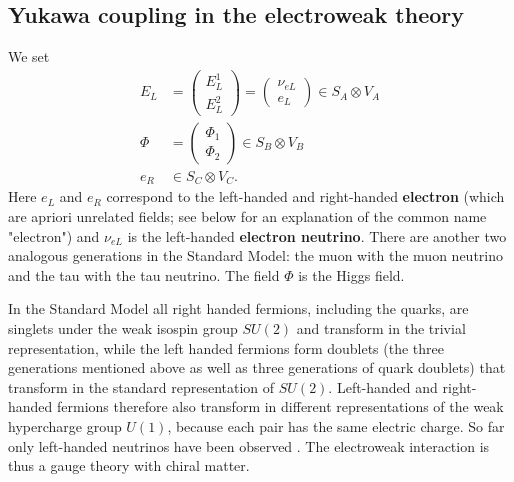 \documentclass[12pt]{amsart}
\theoremstyle{definition}
\theoremstyle{remark}
\numberwithin{equation}{section}
\begin{document}
\subsection{Yukawa coupling in the electroweak theory}
We set
\begin{align*}
E_L&=\left(\begin{array}{c}E^1_L\\ E^2_L\end{array}\right)=\left(\begin{array}{c}\nu_{eL}\\ e_L\end{array}\right)\in S_A\otimes V_A\\
\Phi&=\left(\begin{array}{c}\Phi_1\\\Phi_2\end{array}\right)\in S_B\otimes V_B\\
e_R&\in S_C\otimes V_C.
\end{align*}
Here $e_L$ and $e_R$ correspond to the left-handed and right-handed {\bf electron} (which are apriori unrelated fields; see below for an explanation of the common name "{}electron"{}) and $\nu_{eL}$ is the left-handed {\bf electron neutrino}. There are another two analogous generations in the Standard Model: the muon with the muon neutrino and the tau with the tau neutrino. The field $\Phi$ is the Higgs field. 

In the Standard Model all right handed fermions, including the quarks, are singlets under the weak isospin group $SU(2)$ and transform in the trivial representation, while the left handed fermions form doublets (the three generations mentioned above as well as three generations of quark doublets) that transform in the standard representation of $SU(2)$. Left-handed and right-handed fermions therefore also transform in different representations of the weak hypercharge group $U(1)$, because each pair has the same electric charge. So far only left-handed neutrinos have been observed \cite{Drewes}. The electroweak interaction is thus a gauge theory with chiral matter.
\end{document}
